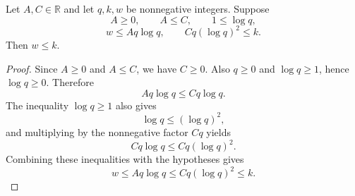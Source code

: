 \begin{helper}
Let \(A,C\in\mathbb R\) and let \(q,k,w\) be nonnegative integers.  Suppose
\[
  A\ge0,\qquad A\le C,\qquad 1\le\log q,
\]
\[
  w\le Aq\log q,
  \qquad
  Cq(\log q)^2\le k.
\]
Then \(w\le k\).
\end{helper}
\begin{proof}
Since \(A\ge0\) and \(A\le C\), we have \(C\ge0\).  Also \(q\ge0\) and
\(\log q\ge1\), hence \(\log q\ge0\).  Therefore
\[
  Aq\log q\le Cq\log q.
\]
The inequality \(\log q\ge1\) also gives
\[
  \log q\le(\log q)^2,
\]
and multiplying by the nonnegative factor \(Cq\) yields
\[
  Cq\log q\le Cq(\log q)^2.
\]
Combining these inequalities with the hypotheses gives
\[
  w\le Aq\log q\le Cq(\log q)^2\le k.
\]
\end{proof}
